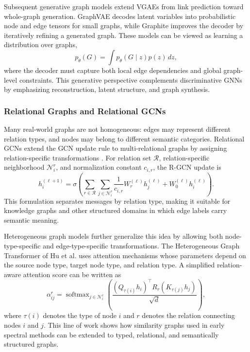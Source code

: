 \documentclass[11pt]{article}
\theoremstyle{definition}
\begin{document}
Subsequent generative graph models extend VGAEs from link prediction toward whole-graph generation. GraphVAE \cite{simonovsky2018graphvae} decodes latent variables into probabilistic node and edge tensors for small graphs, while Graphite \cite{grover2019graphite} improves the decoder by iteratively refining a generated graph. These models can be viewed as learning a distribution over graphs,
\[
    p_\theta(G)
    = \int p_\theta(G\mid z)p(z)\,dz,
\]
where the decoder must capture both local edge dependencies and global graph-level constraints. This generative perspective complements discriminative GNNs by emphasizing reconstruction, latent structure, and graph synthesis.

\subsubsection{Relational Graphs and Relational GCNs}
\label{subsec: rel_graphs}
Many real-world graphs are not homogeneous: edges may represent different relation types, and nodes may belong to different semantic categories. Relational GCNs extend the GCN update rule to multi-relational graphs by assigning relation-specific transformations \cite{schlichtkrull2018modeling}. For relation set $\mathcal{R}$, relation-specific neighborhood $\mathcal{N}_i^r$, and normalization constant $c_{i,r}$, the R-GCN update is
\[
    h_i^{(\ell+1)}
    = \sigma\!\left(
        \sum_{r\in\mathcal{R}}\sum_{j\in\mathcal{N}_i^r}
        \frac{1}{c_{i,r}} W_r^{(\ell)}h_j^{(\ell)}
        + W_0^{(\ell)}h_i^{(\ell)}
      \right).
\]
This formulation separates messages by relation type, making it suitable for knowledge graphs and other structured domains in which edge labels carry semantic meaning.

Heterogeneous graph models further generalize this idea by allowing both node-type-specific and edge-type-specific transformations. The Heterogeneous Graph Transformer of Hu et al. \cite{hu2020heterogeneous} uses attention mechanisms whose parameters depend on the source node type, target node type, and relation type. A simplified relation-aware attention score can be written as
\[
    \alpha_{ij}^{r}
    = \operatorname{softmax}_{j\in\mathcal{N}_i^r}
      \left(
      \frac{(Q_{\tau(i)}h_i)^\top R_r(K_{\tau(j)}h_j)}{\sqrt{d}}
      \right),
\]
where $\tau(i)$ denotes the type of node $i$ and $r$ denotes the relation connecting nodes $i$ and $j$. This line of work shows how similarity graphs used in early spectral methods can be extended to typed, relational, and semantically structured graphs.
\end{document}

